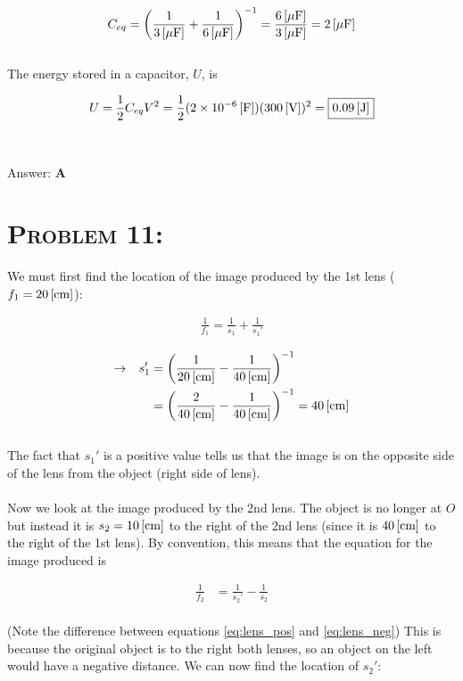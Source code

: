 \documentclass{article}
\providecommand{\e}[1]{\ensuremath{\times 10^{#1}}}
\begin{document}
\begin{align}
C_{eq} =\left(  \frac{1}{\unit[3]{[\mu F]}} + \frac{1}{\unit[6]{[\mu F]}}  \right)^{-1} = \frac{\unit[6]{[\mu F]}}{\unit[3]{[\mu F]}} = \unit[2]{[\mu F]} \nonumber
\end{align}
\\
The energy stored in a capacitor, $U$, is

\begin{gather}
U = \frac{1}{2} C_{eq} V^{2} = \frac{1}{2} (\unit[2\e{-6}]{[F]}) (\unit[300]{[V]})^{2} = \boxed{\unit[0.09]{[J]}}\nonumber
\end{gather}
\\\\
Answer: \textbf{\textcolor{ProcessBlue}A}\\


\section{\textsc{Problem 11:}} We must first find the location of the image produced by the 1st lens ($f_{1} = \unit[20]{[cm]}$):

\begin{gather}
\label{eq:lens_pos} \frac{1}{f_{1}} = \frac{1}{s_{1}} + \frac{1}{s_{1}'}
\end{gather}

\begin{align}
\rightarrow \hspace{.1in} s_{1}' &= \left(   \frac{1}{\unit[20]{[cm]}} - \frac{1}{\unit[40]{[cm]}}  \right)^{-1} \nonumber\\
&= \left(   \frac{2}{\unit[40]{[cm]}} - \frac{1}{\unit[40]{[cm]}}  \right)^{-1} = \unit[40]{[cm]}\nonumber
\end{align}
\\
The fact that $s_{1}'$ is a positive value tells us that the image is on the opposite side of the lens from the object (right side of lens). \\
\\
Now we look at the image produced by the 2nd lens. The object is no longer at $O$ but instead it is $s_{2} = \unit[10]{[cm]}$ to the right of the 2nd lens (since it is $\unit[40]{[cm]}$ to the right of the 1st lens). By convention, this means that the equation for the image produced is

\begin{align}
\label{eq:lens_neg} \frac{1}{f_{2}} &= \frac{1}{s_{2}'} - \frac{1}{s_{2}}
\end{align}
\\
(Note the difference between equations \ref{eq:lens_pos} and  \ref{eq:lens_neg}) This is because the original object is to the right both lenses, so an object on the left would have a negative distance. We can now find the location of $s_{2}'$:
\end{document}
